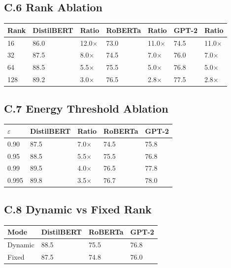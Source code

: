 \subsection{C.6 Rank Ablation}

\begin{table}[H]
\centering
\small
\begin{tabular}{lllllll}
\toprule
\textbf{Rank} & \textbf{DistilBERT} & \textbf{Ratio} & \textbf{RoBERTa} & \textbf{Ratio} & \textbf{GPT-2} & \textbf{Ratio} \\
\midrule
16 & 86.0 & 12.0$\times$ & 73.0 & 11.0$\times$ & 74.5 & 11.0$\times$ \\
32 & 87.5 & 8.0$\times$ & 74.5 & 7.0$\times$ & 76.0 & 7.0$\times$ \\
64 & 88.5 & 5.5$\times$ & 75.5 & 5.0$\times$ & 76.8 & 5.0$\times$ \\
128 & 89.2 & 3.0$\times$ & 76.5 & 2.8$\times$ & 77.5 & 2.8$\times$ \\
\bottomrule
\end{tabular}
\end{table}

\subsection{C.7 Energy Threshold Ablation}

\begin{table}[H]
\centering
\small
\begin{tabular}{lllll}
\toprule
\textbf{$\varepsilon$} & \textbf{DistilBERT} & \textbf{Ratio} & \textbf{RoBERTa} & \textbf{GPT-2} \\
\midrule
0.90 & 87.5 & 7.0$\times$ & 74.5 & 75.8 \\
0.95 & 88.5 & 5.5$\times$ & 75.5 & 76.8 \\
0.99 & 89.5 & 4.0$\times$ & 76.5 & 77.8 \\
0.995 & 89.8 & 3.5$\times$ & 76.7 & 78.0 \\
\bottomrule
\end{tabular}
\end{table}

\subsection{C.8 Dynamic vs Fixed Rank}

\begin{table}[H]
\centering
\small
\begin{tabular}{llll}
\toprule
\textbf{Mode} & \textbf{DistilBERT} & \textbf{RoBERTa} & \textbf{GPT-2} \\
\midrule
Dynamic & 88.5 & 75.5 & 76.8 \\
Fixed & 87.5 & 74.8 & 76.0 \\
\bottomrule
\end{tabular}
\end{table}

